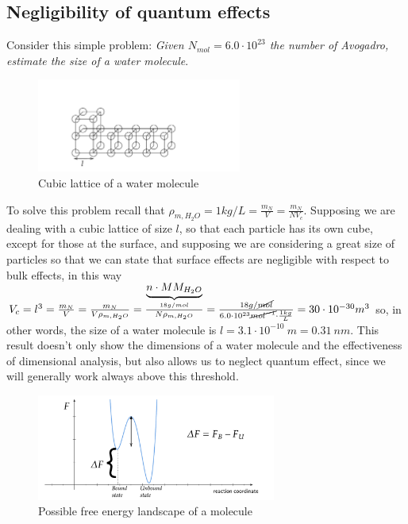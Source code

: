 \documentclass[../main/main.tex]{subfiles}
\begin{document}
\subsection{Negligibility of quantum effects}
Consider this simple problem: \emph{Given $N_{mol} = 6.0\cdot10^{23}$ the number of Avogadro, estimate the size of a water molecule}. 

\begin{figure}
    \centering
    \includegraphics[width=0.6\textwidth]{../frontespizio/tikz/1_lesson/exercise.pdf}
    \caption{\label{fig:water} Cubic lattice of a water molecule}
\end{figure}

To solve this problem recall that $\rho_{m, H_2O}=1kg/L = \frac{m_N}{V}=\frac{m_N}{NV_c}$. Supposing we are dealing with a cubic lattice of size $l$, so that each particle has its own cube, except for those at the surface, and supposing we are considering a great size of particles so that we can state that surface effects are negligible with respect to bulk effects, in this way $V_c = l^3=\frac{m_N}{V}=\frac{m_N}{V\rho_{m, H_2 O}}=\frac{\underbrace{n\cdot MM_{H_2 O}}_{18g/mol}}{N\rho_{m,H_2 O}}=\frac{18g/\cancel{mol}}{6.0\cdot10^{23}\cancel{mol^{-1}}\cdot\frac{1kg}{L}}=30\cdot10^{-30}m^3$ so, in other words, the size of a water molecule is $l=3.1\cdot 10^{-10}\:m=0.31\:nm$. 
This result doesn't only show the dimensions of a water molecule and the effectiveness of dimensional analysis, but also allows us to neglect quantum effect, since we will generally work always above this threshold.

\begin{figure}[h!]
    \centering
    \includegraphics[width=0.7\textwidth]{../frontespizio/tikz/1_lesson/free_energy.pdf}
    \caption{Possible free energy landscape of a molecule}
\end{figure}
\end{document}
